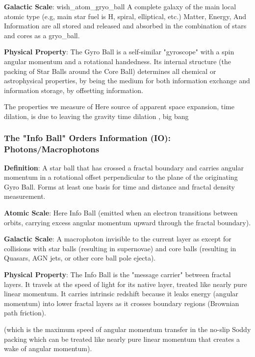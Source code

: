 \documentclass[11pt,a4paper]{article}
\begin{document}
    \noindent\textbf{Galactic Scale}: wish\_atom\_gryo\_ball A complete galaxy of the main local atomic type (e.g, main star fuel is H, spiral, elliptical, etc.) Matter, Energy, And Information are all stored and released and absorbed in the combination of stars and cores as a gryo\_ball.

    \noindent\textbf{Physical Property}: The Gyro Ball is a self-similar "gyroscope" with a spin angular momentum and a rotational handedness. Its internal structure (the packing of Star Balls around the Core Ball) determines all chemical or astrophysical properties, by being the medium for both information exchange and information storage, by offsetting information. 

    The properties we measure of Here  source of apparent space expansion, time dilation, is due to leaving the gravity time dilation ,      big bang 


    \subsubsection{The "Info Ball" Orders Information (IO): Photons/Macrophotons}

    \noindent\textbf{Definition}: A star ball that has crossed a fractal boundary and carries angular momentum in a rotational offset perpendicular to the plane of the originating Gyro Ball. Forms at least one basis for time and distance and fractal density measurement. 

    \noindent\textbf{Atomic Scale}: Here Info Ball (emitted when an electron transitions between orbits, carrying excess angular momentum upward through the fractal boundary).

    \noindent\textbf{Galactic Scale}: A macrophoton invisible to the current layer as except for collisions with star balls (resulting in supernovae) and core balls (resulting in Quasars, AGN jets, or other core ball pole ejecta).

    \noindent\textbf{Physical Property}: The Info Ball is the "message carrier" between fractal layers. It travels at the speed of light for its native layer, treated like nearly pure linear momentum.  It carries intrinsic redshift because it leaks energy (angular momentum) into lower fractal layers as it crosses boundary regions (Brownian path friction).

     (which is the maximum speed of angular momentum transfer in the no-slip Soddy packing which can be treated like nearly pure linear momentum that creates a wake of angular momentum).
\end{document}
